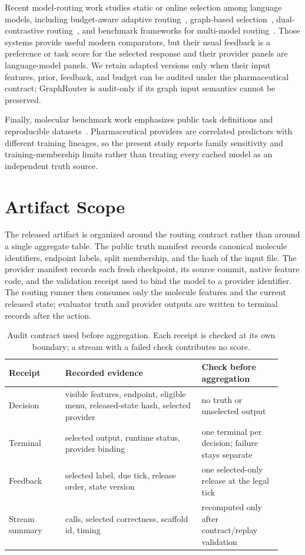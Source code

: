 \documentclass[sigconf,anonymous]{aamas}
\begin{document}
Recent model-routing work studies static or online selection among language models, including budget-aware adaptive routing~\cite{panda2025pilot}, graph-based selection~\cite{feng2025graphrouter}, dual-contrastive routing~\cite{chen2024routerdc}, and benchmark frameworks for multi-model routing~\cite{hu2024routerbench}. Those systems provide useful modern comparators, but their usual feedback is a preference or task score for the selected response and their provider panels are language-model panels. We retain adapted versions only when their input features, prior, feedback, and budget can be audited under the pharmaceutical contract; GraphRouter is audit-only if its graph input semantics cannot be preserved.

Finally, molecular benchmark work emphasizes public task definitions and reproducible datasets~\cite{huang2021tdc,wu2018moleculenet}. Pharmaceutical providers are correlated predictors with different training lineages, so the present study reports family sensitivity and training-membership limits rather than treating every cached model as an independent truth source.

\section{Artifact Scope}
The released artifact is organized around the routing contract rather than around a single aggregate table. The public truth manifest records canonical molecule identifiers, endpoint labels, split membership, and the hash of the input file. The provider manifest records each fresh checkpoint, its source commit, native feature code, and the validation receipt used to bind the model to a provider identifier. The routing runner then consumes only the molecule features and the current released state; evaluator truth and provider outputs are written to terminal records after the action.

\begin{table}[t]
\caption{Audit contract used before aggregation. Each receipt is checked at its own boundary; a stream with a failed check contributes no score.}
\label{tab:audit-contract}
\small
{\setlength{\tabcolsep}{3pt}
\begin{tabular}{@{}P{0.19\linewidth}P{0.46\linewidth}P{0.27\linewidth}@{}}
\toprule
Receipt & Recorded evidence & Check before aggregation \\
\midrule
Decision & visible features, endpoint, eligible menu, released-state hash, selected provider & no truth or unselected output \\
Terminal & selected output, runtime status, provider binding & one terminal per decision; failure stays separate \\
Feedback & selected label, due tick, release order, state version & one selected-only release at the legal tick \\
Stream summary & calls, selected correctness, scaffold id, timing & recomputed only after contract/replay validation \\
\bottomrule
\end{tabular}}
\end{table}
\end{document}
